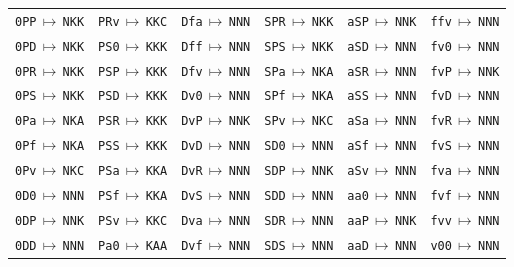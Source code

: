 {\begin{longtable}{@{}llllll@{}}
\texttt{0PP}\,$\mapsto$\,\texttt{NKK} & \texttt{PRv}\,$\mapsto$\,\texttt{KKC} & \texttt{Dfa}\,$\mapsto$\,\texttt{NNN} & \texttt{SPR}\,$\mapsto$\,\texttt{NKK} & \texttt{aSP}\,$\mapsto$\,\texttt{NNK} & \texttt{ffv}\,$\mapsto$\,\texttt{NNN} \\
\texttt{0PD}\,$\mapsto$\,\texttt{NKK} & \texttt{PS0}\,$\mapsto$\,\texttt{KKK} & \texttt{Dff}\,$\mapsto$\,\texttt{NNN} & \texttt{SPS}\,$\mapsto$\,\texttt{NKK} & \texttt{aSD}\,$\mapsto$\,\texttt{NNN} & \texttt{fv0}\,$\mapsto$\,\texttt{NNN} \\
\texttt{0PR}\,$\mapsto$\,\texttt{NKK} & \texttt{PSP}\,$\mapsto$\,\texttt{KKK} & \texttt{Dfv}\,$\mapsto$\,\texttt{NNN} & \texttt{SPa}\,$\mapsto$\,\texttt{NKA} & \texttt{aSR}\,$\mapsto$\,\texttt{NNN} & \texttt{fvP}\,$\mapsto$\,\texttt{NNK} \\
\texttt{0PS}\,$\mapsto$\,\texttt{NKK} & \texttt{PSD}\,$\mapsto$\,\texttt{KKK} & \texttt{Dv0}\,$\mapsto$\,\texttt{NNN} & \texttt{SPf}\,$\mapsto$\,\texttt{NKA} & \texttt{aSS}\,$\mapsto$\,\texttt{NNN} & \texttt{fvD}\,$\mapsto$\,\texttt{NNN} \\
\texttt{0Pa}\,$\mapsto$\,\texttt{NKA} & \texttt{PSR}\,$\mapsto$\,\texttt{KKK} & \texttt{DvP}\,$\mapsto$\,\texttt{NNK} & \texttt{SPv}\,$\mapsto$\,\texttt{NKC} & \texttt{aSa}\,$\mapsto$\,\texttt{NNN} & \texttt{fvR}\,$\mapsto$\,\texttt{NNN} \\
\texttt{0Pf}\,$\mapsto$\,\texttt{NKA} & \texttt{PSS}\,$\mapsto$\,\texttt{KKK} & \texttt{DvD}\,$\mapsto$\,\texttt{NNN} & \texttt{SD0}\,$\mapsto$\,\texttt{NNN} & \texttt{aSf}\,$\mapsto$\,\texttt{NNN} & \texttt{fvS}\,$\mapsto$\,\texttt{NNN} \\
\texttt{0Pv}\,$\mapsto$\,\texttt{NKC} & \texttt{PSa}\,$\mapsto$\,\texttt{KKA} & \texttt{DvR}\,$\mapsto$\,\texttt{NNN} & \texttt{SDP}\,$\mapsto$\,\texttt{NNK} & \texttt{aSv}\,$\mapsto$\,\texttt{NNN} & \texttt{fva}\,$\mapsto$\,\texttt{NNN} \\
\texttt{0D0}\,$\mapsto$\,\texttt{NNN} & \texttt{PSf}\,$\mapsto$\,\texttt{KKA} & \texttt{DvS}\,$\mapsto$\,\texttt{NNN} & \texttt{SDD}\,$\mapsto$\,\texttt{NNN} & \texttt{aa0}\,$\mapsto$\,\texttt{NNN} & \texttt{fvf}\,$\mapsto$\,\texttt{NNN} \\
\texttt{0DP}\,$\mapsto$\,\texttt{NNK} & \texttt{PSv}\,$\mapsto$\,\texttt{KKC} & \texttt{Dva}\,$\mapsto$\,\texttt{NNN} & \texttt{SDR}\,$\mapsto$\,\texttt{NNN} & \texttt{aaP}\,$\mapsto$\,\texttt{NNK} & \texttt{fvv}\,$\mapsto$\,\texttt{NNN} \\
\texttt{0DD}\,$\mapsto$\,\texttt{NNN} & \texttt{Pa0}\,$\mapsto$\,\texttt{KAA} & \texttt{Dvf}\,$\mapsto$\,\texttt{NNN} & \texttt{SDS}\,$\mapsto$\,\texttt{NNN} & \texttt{aaD}\,$\mapsto$\,\texttt{NNN} & \texttt{v00}\,$\mapsto$\,\texttt{NNN} \\

\end{longtable}}
